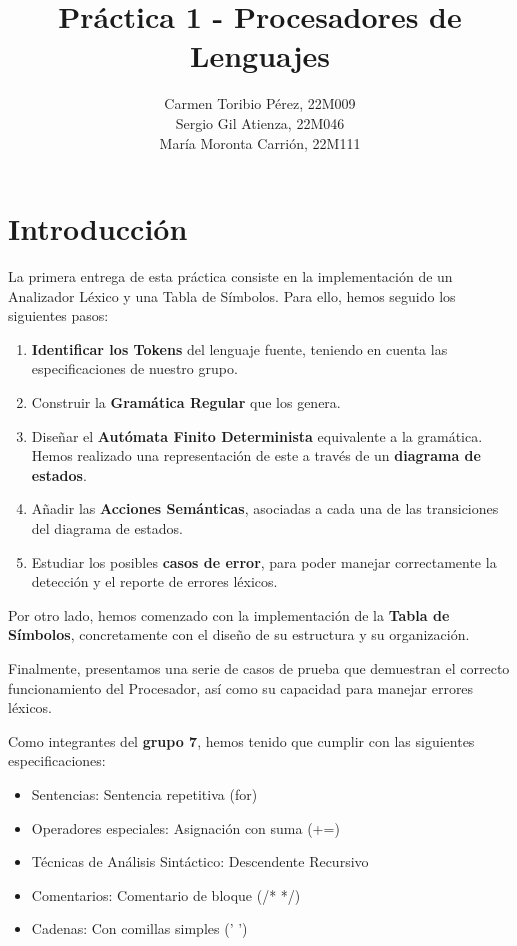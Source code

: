 \documentclass{article}
\title{Práctica 1 - Procesadores de Lenguajes}
\author{Carmen Toribio Pérez, 22M009\\Sergio Gil Atienza, 22M046\\María Moronta Carrión, 22M111}
\date{}
\begin{document}
\maketitle

\section{Introducción}

La primera entrega de esta práctica consiste en la implementación de un Analizador Léxico y una Tabla de Símbolos. Para ello, hemos seguido los siguientes pasos: 
\begin{enumerate}
    \item \textbf{Identificar los Tokens} del lenguaje fuente, teniendo en cuenta las especificaciones de nuestro grupo.
    \item Construir la \textbf{Gramática Regular} que los genera.
    \item Diseñar el \textbf{Autómata Finito Determinista} equivalente a la gramática. Hemos realizado una representación de este a través de un \textbf{diagrama de estados}.
    \item Añadir las \textbf{Acciones Semánticas}, asociadas a cada una de las transiciones del diagrama de estados.
    \item Estudiar los posibles \textbf{casos de error}, para poder manejar correctamente la detección y el reporte de errores léxicos. 
\end{enumerate}

 \vspace{0.5cm}
 
 Por otro lado, hemos comenzado con la implementación de la \textbf{Tabla de Símbolos}, concretamente con el diseño de su estructura y su organización.

 \vspace{0.5cm}
 
 Finalmente, presentamos una serie de casos de prueba que demuestran el correcto funcionamiento del Procesador, así como su capacidad para manejar errores léxicos.
 
 \vspace{0.5cm}

Como integrantes del \textbf{grupo 7}, hemos tenido que cumplir con las siguientes especificaciones: 
\begin{itemize}[left=2cm]
    \item Sentencias: Sentencia repetitiva (for)
    \item Operadores especiales: Asignación con suma (+=)
    \item Técnicas de Análisis Sintáctico: Descendente Recursivo
    \item Comentarios: Comentario de bloque (/* */)
    \item Cadenas: Con comillas simples (' ')
\end{itemize}
\end{document}
